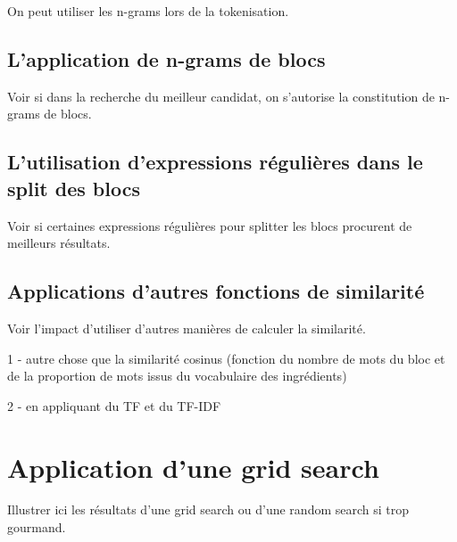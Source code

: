             On peut utiliser les n-grams lors de la tokenisation.

            \subsection{L'application de \og n-grams \fg de blocs}

            Voir si dans la recherche du meilleur candidat, on s'autorise la constitution de \og n-grams \fg de blocs.

            \subsection{L'utilisation d'expressions régulières dans le split des blocs}

            Voir si certaines expressions régulières pour splitter les blocs procurent de meilleurs résultats.

            \subsection{Applications d'autres fonctions de similarité}

            Voir l'impact d'utiliser d'autres manières de calculer la similarité.

            1 - autre chose que la similarité cosinus (fonction du nombre de mots du bloc et de la proportion de mots issus du vocabulaire des ingrédients)

            2 - en appliquant du TF et du TF-IDF

        \section{Application d'une grid search}

        Illustrer ici les résultats d'une grid search ou d'une random search si trop gourmand.